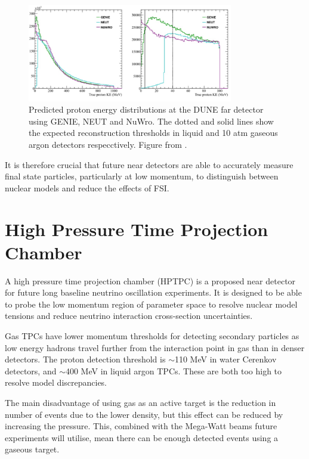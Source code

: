 \begin{figure}
\centering
\includegraphics*[width=0.8\textwidth,clip]{figs/neutgenienuwro}
\caption{Predicted proton energy distributions at the DUNE far detector using GENIE, NEUT and NuWro. The dotted and solid lines show the expected reconstruction thresholds in liquid and 10 atm gaseous argon detectors respecctively. Figure from \cite{dunehptpc}.}\label{fig:generators}
\end{figure}

It is therefore crucial that future near detectors are able to accurately measure final state particles, particularly at low momentum, to distinguish between nuclear models and reduce the effects of FSI.

\section{High Pressure Time Projection Chamber}

A high pressure time projection chamber (HPTPC) is a proposed near detector for future long baseline neutrino oscillation experiments. It is designed to be able to probe the low momentum region of parameter space to resolve nuclear model tensions and reduce neutrino interaction cross-section uncertainties.

Gas TPCs have lower momentum thresholds for detecting secondary particles as low energy hadrons travel further from the interaction point in gas than in denser detectors. The proton detection threshold is $\sim$110 MeV in water Cerenkov detectors, and $\sim$400 MeV in liquid argon TPCs. These are both too high to resolve model discrepancies. 

The main disadvantage of using gas as an active target is the reduction in number of events due to the lower density, but this effect can be reduced by increasing the pressure. This, combined with the Mega-Watt beams future experiments will utilise, mean there can be enough detected events using a gaseous target.

